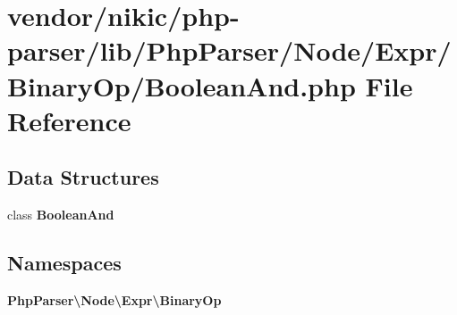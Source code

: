 \section{vendor/nikic/php-\/parser/lib/\+Php\+Parser/\+Node/\+Expr/\+Binary\+Op/\+Boolean\+And.php File Reference}
\label{_boolean_and_8php}
\subsection*{Data Structures}
\begin{DoxyCompactItemize}
\item 
class {\bf Boolean\+And}
\end{DoxyCompactItemize}
\subsection*{Namespaces}
\begin{DoxyCompactItemize}
\item 
 {\bf Php\+Parser\textbackslash{}\+Node\textbackslash{}\+Expr\textbackslash{}\+Binary\+Op}
\end{DoxyCompactItemize}
